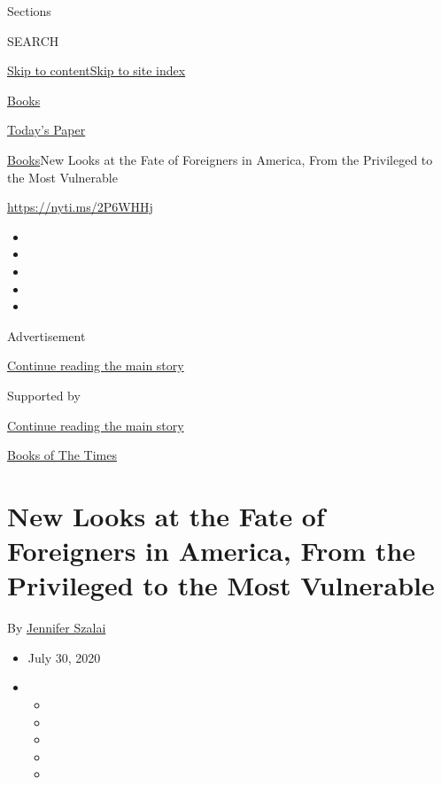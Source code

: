 Sections

SEARCH

\protect\hyperlink{site-content}{Skip to
content}\protect\hyperlink{site-index}{Skip to site index}

\href{https://www.nytimes.com/section/books}{Books}

\href{https://myaccount.nytimes.com/auth/login?response_type=cookie\&client_id=vi}{}

\href{https://www.nytimes.com/section/todayspaper}{Today's Paper}

\href{/section/books}{Books}\textbar{}New Looks at the Fate of
Foreigners in America, From the Privileged to the Most Vulnerable

\url{https://nyti.ms/2P6WHHj}

\begin{itemize}
\item
\item
\item
\item
\item
\end{itemize}

Advertisement

\protect\hyperlink{after-top}{Continue reading the main story}

Supported by

\protect\hyperlink{after-sponsor}{Continue reading the main story}

\href{/column/books-of-the-times}{Books of The Times}

\hypertarget{new-looks-at-the-fate-of-foreigners-in-america-from-the-privileged-to-the-most-vulnerable}{%
\section{New Looks at the Fate of Foreigners in America, From the
Privileged to the Most
Vulnerable}\label{new-looks-at-the-fate-of-foreigners-in-america-from-the-privileged-to-the-most-vulnerable}}

By \href{https://www.nytimes.com/by/jennifer-szalai}{Jennifer Szalai}

\begin{itemize}
\item
  July 30, 2020
\item
  \begin{itemize}
  \item
  \item
  \item
  \item
  \item
  \end{itemize}
\end{itemize}

